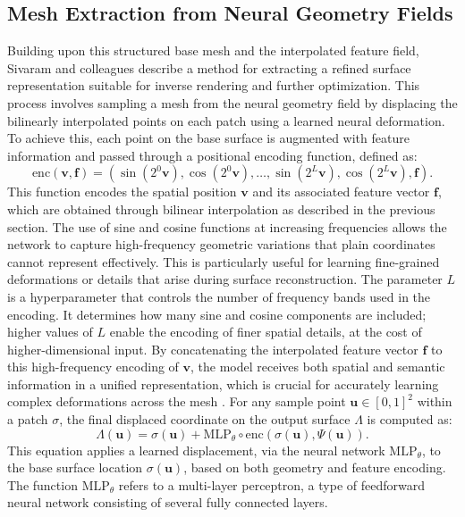 \subsection{Mesh Extraction from Neural Geometry Fields}

Building upon this structured base mesh and the interpolated feature field, Sivaram and colleagues describe a method for extracting a refined surface representation suitable for inverse rendering and further optimization. 
This process involves sampling a mesh from the neural geometry field by displacing the bilinearly interpolated points on each patch using a learned neural deformation. 
To achieve this, each point on the base surface is augmented with feature information and passed through a positional encoding function, defined as: 
\[\text{enc}(\mathbf{v}, \mathbf{f}) = (\sin(2^0 \mathbf{v}), \cos(2^0 \mathbf{v}), \ldots, \sin(2^L \mathbf{v}), \cos(2^L \mathbf{v}), \mathbf{f}). \tag{3}\] 
This function encodes the spatial position $\mathbf{v}$ and its associated feature vector $\mathbf{f}$, which are obtained through bilinear interpolation as described in the previous section. 
The use of sine and cosine functions at increasing frequencies allows the network to capture high-frequency geometric variations that plain coordinates cannot represent effectively. 
This is particularly useful for learning fine-grained deformations or details that arise during surface reconstruction. 
The parameter $L$ is a hyperparameter that controls the number of frequency bands used in the encoding. 
It determines how many sine and cosine components are included; higher values of $L$ enable the encoding of finer spatial details, at the cost of higher-dimensional input. 
By concatenating the interpolated feature vector $\mathbf{f}$ to this high-frequency encoding of $\mathbf{v}$, the model receives both spatial and semantic information in a unified representation, which is crucial for accurately learning complex deformations across the mesh \cite{Mildenhall2020}. 
For any sample point $\mathbf{u} \in [0,1]^2$ within a patch $\sigma$, the final displaced coordinate on the output surface $\Lambda$ is computed as:\[
\Lambda(\mathbf{u}) = \sigma(\mathbf{u}) + \text{MLP}_\theta \circ \text{enc}(\sigma(\mathbf{u}), \Psi(\mathbf{u})). \tag{4}\] 
This equation applies a learned displacement, via the neural network $\text{MLP}_\theta$, to the base surface location $\sigma(\mathbf{u})$, based on both geometry and feature encoding. 
The function $\text{MLP}_\theta$ refers to a multi-layer perceptron, a type of feedforward neural network consisting of several fully connected layers. 
